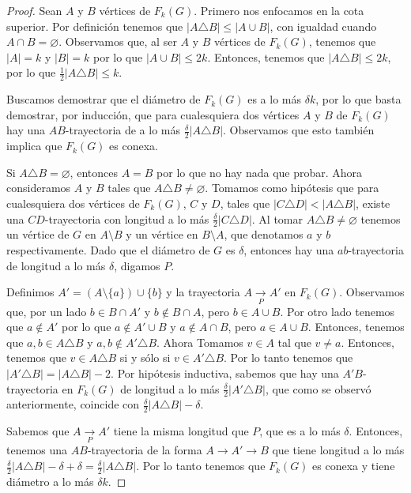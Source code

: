 \begin{proof}
Sean $A$ y $B$ v\'ertices de $F_{k}(G)$. Primero nos enfocamos en la cota
superior. Por definici\'on tenemos que $|A \triangle B| \leq |A \cup B|$, con
igualdad cuando $A \cap B = \varnothing$. Observamos que, al ser $A$ y $B$
v\'ertices de $F_{k}(G)$, tenemos que $|A|=k$ y $|B|=k$ por lo que $|A \cup B|
\le 2k$. Entonces, tenemos que $|A \triangle B| \leq 2k$, por lo que
$\frac{1}{2} |A \triangle B| \leq k$.

Buscamos demostrar que el di\'ametro de $F_{k}(G)$ es a lo m\'as $\delta k$, por
lo que basta demostrar, por inducci\'on, que para cualesquiera dos v\'ertices
$A$ y $B$ de $F_{k}(G)$ hay una $AB$-trayectoria de a lo m\'as
$\frac{\delta}{2}|A\triangle B|$. Observamos que esto tambi\'en implica que
$F_{k}(G)$ es conexa.

Si $A\triangle B=\varnothing$, entonces $A=B$ por lo que no hay nada que probar.
Ahora consideramos $A$ y $B$ tales que $A\triangle B \neq \varnothing$. Tomamos
como hip\'otesis que para cualesquiera dos v\'ertices de $F_{k}(G)$, $C$ y $D$,
tales que $|C\triangle D|<|A \triangle B|$, existe una $CD$-trayectoria con
longitud a lo m\'as $\frac{\delta}{2}|C\triangle D|$. Al tomar $A\triangle B
\neq \varnothing$ tenemos un v\'ertice de $G$ en $A\setminus B$ y un v\'ertice
en $B\setminus A$, que denotamos $a$ y $b$ respectivamente. Dado que el
di\'ametro de $G$ es $\delta$, entonces hay una $ab$-trayectoria de longitud a
lo m\'as $\delta$, digamos $P$.

Definimos $A'=(A\setminus \{a\})\cup \{b\}$ y la trayectoria $A\xrightarrow[P]{}
A'$ en $F_{k}(G)$. Observamos que, por un lado $b\in B\cap A'$ y $b\notin B\cap
A$, pero $b\in A\cup B$. Por otro lado tenemos que $a\notin A'$ por lo que
$a\notin A'\cup B$ y $a\notin A\cap B$, pero $a\in A\cup B$. Entonces, tenemos
que $a,b \in A\triangle B$ y $a,b \notin A'\triangle B$. Ahora Tomamos $v\in A$
tal que $v \neq a$. Entonces, tenemos que $v \in A\triangle B$ si y s\'olo si
$v\in A'\triangle B$. Por lo tanto tenemos que $|A'\triangle B|=|A \triangle B|-
2$. Por hip\'otesis inductiva, sabemos que hay una $A'B$-trayectoria en
$F_{k}(G)$ de longitud a lo m\'as $\frac{\delta}{2}|A'\triangle B|$, que como se
observ\'o anteriormente, coincide con $\frac{\delta}{2}|A\triangle B| - \delta$.

Sabemos que $A\xrightarrow[P]{} A'$ tiene la misma longitud que $P$, que es a lo
m\'as $\delta$. Entonces, tenemos una $AB$-trayectoria de la forma $A\rightarrow
A'\rightarrow B$ que tiene longitud a lo m\'as $\frac{\delta}{2}|A\triangle
B|-\delta +\delta =\frac{\delta}{2}|A\triangle B|$. Por lo tanto tenemos que
$F_{k}(G)$ es conexa y tiene di\'ametro a lo m\'as $\delta k$.


\end{proof}
